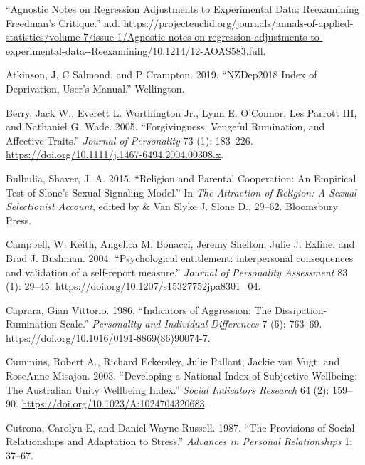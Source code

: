 \documentclass[
  singlecolumn]{report}
\newlength{\cslhangindent}
\newlength{\cslentryspacingunit} %
\newenvironment{CSLReferences}[2] %
 {%
  \setlength{\parindent}{0pt}
  \ifodd #1
  \let\oldpar\par
  \def\par{\hangindent=\cslhangindent\oldpar}
  \fi
  \setlength{\parskip}{#2\cslentryspacingunit}
 }%
 {}
\begin{document}
\hypertarget{refs}{}
\begin{CSLReferences}{1}{0}
\leavevmode{}%
{``Agnostic Notes on Regression Adjustments to Experimental Data:
Reexamining Freedman{'}s Critique.''} n.d.
\url{https://projecteuclid.org/journals/annals-of-applied-statistics/volume-7/issue-1/Agnostic-notes-on-regression-adjustments-to-experimental-data--Reexamining/10.1214/12-AOAS583.full}.

\leavevmode{}%
Atkinson, J, C Salmond, and P Crampton. 2019. {``NZDep2018 Index of
Deprivation, User{'}s Manual.''} Wellington.

\leavevmode{}%
Berry, Jack W., Everett L. Worthington Jr., Lynn E. O'Connor, Les
Parrott III, and Nathaniel G. Wade. 2005. {``Forgivingness, Vengeful
Rumination, and Affective Traits.''} \emph{Journal of Personality} 73
(1): 183--226. \url{https://doi.org/10.1111/j.1467-6494.2004.00308.x}.

\leavevmode{}%
Bulbulia, Shaver, J. A. 2015. {``Religion and Parental Cooperation: An
Empirical Test of Slone's Sexual Signaling Model.''} In \emph{The
Attraction of Religion: A Sexual Selectionist Account}, edited by \& Van
Slyke J. Slone D., 29--62. Bloomsbury Press.

\leavevmode{}%
Campbell, W. Keith, Angelica M. Bonacci, Jeremy Shelton, Julie J.
Exline, and Brad J. Bushman. 2004. {``Psychological entitlement:
interpersonal consequences and validation of a self-report measure.''}
\emph{Journal of Personality Assessment} 83 (1): 29--45.
\url{https://doi.org/10.1207/s15327752jpa8301_04}.

\leavevmode{}%
Caprara, Gian Vittorio. 1986. {``Indicators of Aggression: The
Dissipation-Rumination Scale.''} \emph{Personality and Individual
Differences} 7 (6): 763--69.
\url{https://doi.org/10.1016/0191-8869(86)90074-7}.

\leavevmode{}%
Cummins, Robert A., Richard Eckersley, Julie Pallant, Jackie van Vugt,
and RoseAnne Misajon. 2003. {``Developing a National Index of Subjective
Wellbeing: The Australian Unity Wellbeing Index.''} \emph{Social
Indicators Research} 64 (2): 159--90.
\url{https://doi.org/10.1023/A:1024704320683}.

\leavevmode{}%
Cutrona, Carolyn E, and Daniel Wayne Russell. 1987. {``The Provisions of
Social Relationships and Adaptation to Stress.''} \emph{Advances in
Personal Relationships} 1: 37--67.


\end{CSLReferences}
\end{document}
